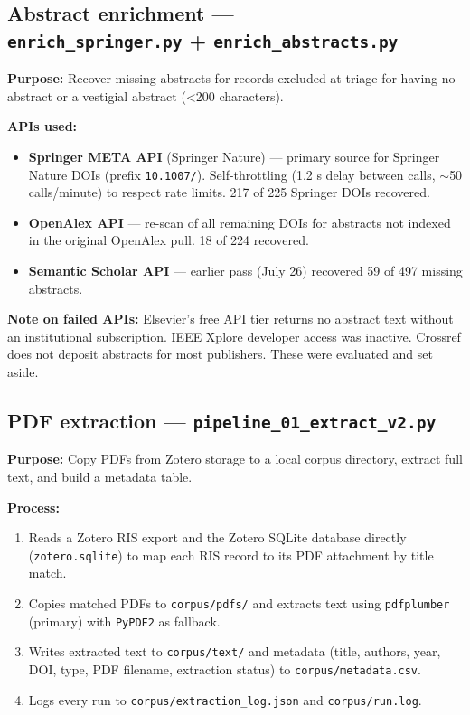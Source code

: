 \subsection[Abstract enrichment]{Abstract enrichment --- \\ \texttt{enrich\_springer.py} + \texttt{enrich\_abstracts.py}}

\textbf{Purpose:} Recover missing abstracts for records excluded at triage for having no abstract or a vestigial abstract (<200 characters).

\textbf{APIs used:}
\begin{itemize}
  \item \textbf{Springer META API} (Springer Nature) --- primary source for Springer Nature DOIs (prefix \texttt{10.1007/}). Self-throttling (1.2 s delay between calls, $\sim$50 calls/minute) to respect rate limits. 217 of 225 Springer DOIs recovered.
  \item \textbf{OpenAlex API} --- re-scan of all remaining DOIs for abstracts not indexed in the original OpenAlex pull. 18 of 224 recovered.
  \item \textbf{Semantic Scholar API} --- earlier pass (July 26) recovered 59 of 497 missing abstracts.
\end{itemize}

\textbf{Note on failed APIs:} Elsevier's free API tier returns no abstract text without an institutional subscription. IEEE Xplore developer access was inactive. Crossref does not deposit abstracts for most publishers. These were evaluated and set aside.

\subsection{PDF extraction --- \texttt{pipeline\_01\_extract\_v2.py}}

\textbf{Purpose:} Copy PDFs from Zotero storage to a local corpus directory, extract full text, and build a metadata table.

\textbf{Process:}
\begin{enumerate}
  \item Reads a Zotero RIS export and the Zotero SQLite database directly (\texttt{zotero.\allowbreak sqlite}) to map each RIS record to its PDF attachment by title match.
  \item Copies matched PDFs to \texttt{corpus/pdfs/} and extracts text using \texttt{pdfplumber} (primary) with \texttt{PyPDF2} as fallback.
  \item Writes extracted text to \texttt{corpus/text/} and metadata (title, authors, year, DOI, type, PDF filename, extraction status) to \texttt{corpus/metadata.csv}.
  \item Logs every run to \texttt{corpus/extraction\_log.json} and \texttt{corpus/run.log}.
\end{enumerate}

